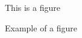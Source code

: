 
\begin{figure}
\small
\center
This is a figure
\caption{Example of a figure}
\label{fig:example}
\end{figure}
